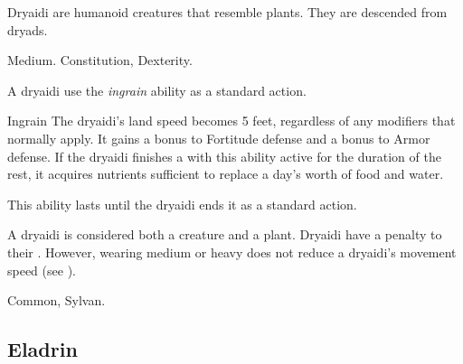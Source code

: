         Dryaidi are humanoid creatures that resemble plants. They are descended from dryads.

         Medium.
          Constitution,  Dexterity.
        \begin{itemize}
             A dryaidi use the \textit{ingrain} ability as a standard action.
                \begin{activeability}{Ingrain}
                    \rankline
                    The dryaidi's land speed becomes 5 feet, regardless of any modifiers that normally apply.
                    It gains a  bonus to Fortitude defense and a  bonus to Armor defense.
                    If the dryaidi finishes a  with this ability active for the duration of the rest, it acquires nutrients sufficient to replace a day's worth of food and water.

                    This ability lasts until the dryaidi ends it as a standard action.
                \end{activeability}
             A dryaidi is considered both a creature and a plant.
             Dryaidi have a  penalty to their .
                However, wearing medium or heavy  does not reduce a dryaidi's movement speed (see ).
        \end{itemize}
         Common, Sylvan.

    \subsection{Eladrin}


